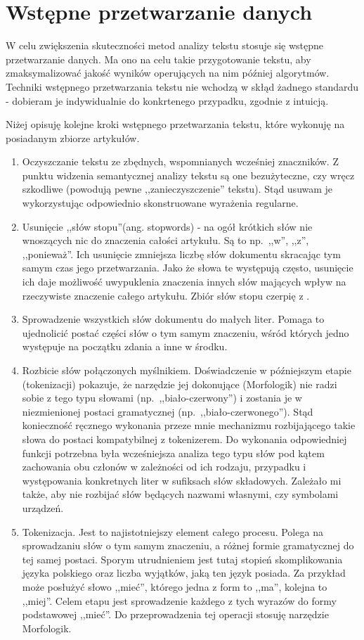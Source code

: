 \documentclass[pl]{minipw} %
\begin{document}
\section{Wstępne przetwarzanie danych}

W celu zwiększenia skuteczności metod analizy tekstu stosuje się wstępne przetwarzanie danych. Ma ono na celu takie przygotowanie tekstu, aby zmaksymalizować jakość wyników operujących na nim później algorytmów. Techniki wstępnego przetwarzania tekstu nie wchodzą w skłąd żadnego standardu - dobieram je indywidualnie do konkrtenego przypadku, zgodnie z intuicją.

Niżej opisuję kolejne kroki wstępnego przetwarzania tekstu, które wykonuję na posiadanym zbiorze artykułów.
\begin{enumerate}
	\item Oczyszczanie tekstu ze zbędnych, wspomnianych wcześniej znaczników. Z punktu widzenia semantycznej analizy tekstu są one bezużyteczne, czy wręcz szkodliwe (powodują pewne ,,zanieczyszczenie'' tekstu). Stąd usuwam je wykorzystując odpowiednio skonstruowane wyrażenia regularne.
	\item Usunięcie ,,słów stopu''(ang. stopwords) - na ogół krótkich słów nie wnoszących nic do znaczenia całości artykułu. Są to np.~,,w'', ,,z'', ,,ponieważ''. Ich usunięcie zmniejsza liczbę słów dokumentu skracając tym samym czas jego przetwarzania. Jako że słowa te występują często, usunięcie ich daje możliwość uwypuklenia znaczenia innych słów mających wpływ na rzeczywiste znaczenie całego artykułu. Zbiór słów stopu czerpię z \cite{stopwords}.
	\item Sprowadzenie wszystkich słów dokumentu do małych liter. Pomaga to ujednolicić postać części słów o tym samym znaczeniu, wśród których jedno występuje na początku zdania a inne w środku.
	\item Rozbicie słów połączonych myślnikiem. Doświadczenie w późniejszym etapie (tokenizacji) pokazuje, że narzędzie jej dokonujące (Morfologik\cite{morfologik}) nie radzi sobie z tego typu słowami (np.~,,biało-czerwony'') i zostania je w niezmienionej postaci gramatycznej (np.~,,biało-czerwonego''). Stąd konieczność ręcznego wykonania przeze mnie mechanizmu rozbijającego takie słowa do postaci kompatybilnej z tokenizerem. Do wykonania odpowiedniej funkcji potrzebna była wcześniejsza analiza tego typu słów pod kątem zachowania obu członów w zależności od ich rodzaju, przypadku i występowania konkretnych liter w sufiksach słów składowych. Zależało mi także, aby nie rozbijać słów będących nazwami własnymi, czy symbolami urządzeń.
	\item Tokenizacja. Jest to najistotniejszy element całego procesu. Polega na sprowadzaniu słów o tym samym znaczeniu, a różnej formie gramatycznej do tej samej postaci. Sporym utrudnieniem jest tutaj stopień skomplikowania języka polskiego oraz liczba wyjątków, jaką ten język posiada. Za przykład może posłużyć słowo ,,mieć'', którego jedna z form to ,,ma'', kolejna to ,,miej''. Celem etapu jest sprowadzenie każdego z tych wyrazów do formy podstawowej ,,mieć''. Do przeprowadzenia tej operacji stosuję narzędzie Morfologik\cite{morfologik}.
\end{enumerate}
\end{document}
